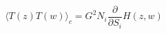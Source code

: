 \begin{equation}
\langle T(z) T(w)\rangle_c =G^2 N_i \frac{\partial}{\partial S_i}H(z,w)
\end{equation}

